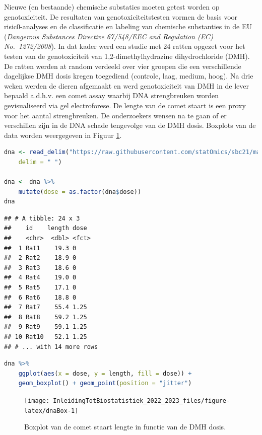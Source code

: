 \documentclass[
  12pt,dutch,coursenotes]{book}
\begin{document}
Nieuwe (en bestaande) chemische substaties moeten getest worden op genotoxiciteit. De resultaten van genotoxiciteitstesten vormen de basis voor risic0-analyses en de classificatie en labeling van chemische substanties in de EU (\emph{Dangerous Substances Directive 67/548/EEC and Regulation (EC) No.~1272/2008}). In dat kader werd een studie met 24 ratten opgezet voor het testen van de genotoxiciteit van 1,2-dimethylhydrazine dihydrochloride (DMH).
De ratten werden at random verdeeld over vier groepen die een verschillende dagelijkse DMH dosis kregen toegediend (controle, laag, medium, hoog).
Na drie weken werden de dieren afgemaakt en werd genotoxiciteit van DMH in de lever bepaald a.d.h.v. een comet assay waarbij DNA strengbreuken worden gevisualiseerd via gel electroforese.
De lengte van de comet staart is een proxy voor het aantal strengbreuken.
De onderzoekers wensen na te gaan of er verschillen zijn in de DNA schade tengevolge van de DMH dosis.
Boxplots van de data worden weergegeven in Figuur \ref{fig:dnaBox}.

\begin{lstlisting}[language=R]
dna <- read_delim("https://raw.githubusercontent.com/statOmics/sbc21/master/data/dna.txt",
    delim = " ")

dna <- dna %>%
    mutate(dose = as.factor(dna$dose))
dna
\end{lstlisting}

\begin{lstlisting}
## # A tibble: 24 x 3
##    id    length dose 
##    <chr>  <dbl> <fct>
##  1 Rat1    19.3 0    
##  2 Rat2    18.9 0    
##  3 Rat3    18.6 0    
##  4 Rat4    19.0 0    
##  5 Rat5    17.1 0    
##  6 Rat6    18.8 0    
##  7 Rat7    55.4 1.25 
##  8 Rat8    59.2 1.25 
##  9 Rat9    59.1 1.25 
## 10 Rat10   52.1 1.25 
## # ... with 14 more rows
\end{lstlisting}

\begin{lstlisting}[language=R]
dna %>%
    ggplot(aes(x = dose, y = length, fill = dose)) +
    geom_boxplot() + geom_point(position = "jitter")
\end{lstlisting}

\begin{figure}

{\centering \texttt{[image: InleidingTotBiostatistiek\_2022\_2023\_files/figure-latex/dnaBox-1]} 

}

\caption{Boxplot van de comet staart lengte in functie van de DMH dosis.}\label{fig:dnaBox}
\end{figure}
\end{document}

